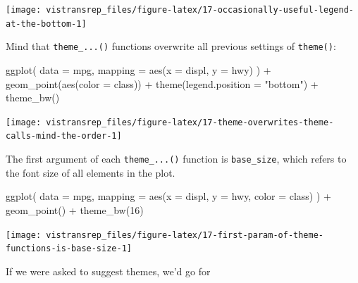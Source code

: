 \documentclass[]{book}
\newenvironment{Shaded}{}{}
\newcommand{\DataTypeTok}[1]{#1}
\newcommand{\DecValTok}[1]{#1}
\newcommand{\KeywordTok}[1]{\textcolor[rgb]{0.00,0.00,1.00}{#1}}
\newcommand{\NormalTok}[1]{#1}
\newcommand{\OperatorTok}[1]{#1}
\newcommand{\StringTok}[1]{\textcolor[rgb]{0.00,0.50,0.50}{#1}}
\begin{document}
\begin{flushright}\texttt{[image: vistransrep\_files/figure-latex/17-occasionally-useful-legend-at-the-bottom-1]} \end{flushright}

Mind that \texttt{theme\_...()} functions overwrite all previous settings of \texttt{theme()}:

\begin{Shaded}
\begin{Highlighting}[]
\KeywordTok{ggplot}\NormalTok{(}
  \DataTypeTok{data =}\NormalTok{ mpg,}
  \DataTypeTok{mapping =} \KeywordTok{aes}\NormalTok{(}\DataTypeTok{x =}\NormalTok{ displ, }\DataTypeTok{y =}\NormalTok{ hwy)}
\NormalTok{) }\OperatorTok{+}
\StringTok{  }\KeywordTok{geom_point}\NormalTok{(}\KeywordTok{aes}\NormalTok{(}\DataTypeTok{color =}\NormalTok{ class)) }\OperatorTok{+}
\StringTok{  }\KeywordTok{theme}\NormalTok{(}\DataTypeTok{legend.position =} \StringTok{"bottom"}\NormalTok{) }\OperatorTok{+}
\StringTok{  }\KeywordTok{theme_bw}\NormalTok{()}
\end{Highlighting}
\end{Shaded}

\begin{flushright}\texttt{[image: vistransrep\_files/figure-latex/17-theme-overwrites-theme-calls-mind-the-order-1]} \end{flushright}

The first argument of each \texttt{theme\_...()} function is \texttt{base\_size}, which refers to the font size of all elements in the plot.

\begin{Shaded}
\begin{Highlighting}[]
\KeywordTok{ggplot}\NormalTok{(}
  \DataTypeTok{data =}\NormalTok{ mpg,}
  \DataTypeTok{mapping =} \KeywordTok{aes}\NormalTok{(}\DataTypeTok{x =}\NormalTok{ displ, }\DataTypeTok{y =}\NormalTok{ hwy, }\DataTypeTok{color =}\NormalTok{ class)}
\NormalTok{) }\OperatorTok{+}
\StringTok{  }\KeywordTok{geom_point}\NormalTok{() }\OperatorTok{+}
\StringTok{  }\KeywordTok{theme_bw}\NormalTok{(}\DecValTok{16}\NormalTok{)}
\end{Highlighting}
\end{Shaded}

\begin{flushright}\texttt{[image: vistransrep\_files/figure-latex/17-first-param-of-theme-functions-is-base-size-1]} \end{flushright}

If we were asked to suggest themes, we'd go for
\end{document}
